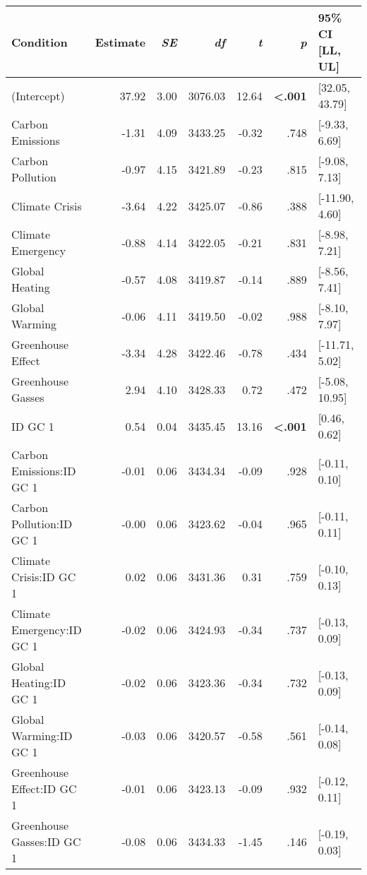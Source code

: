 \begin{table}[ht]
\centering
\begin{tabular}{lrrrrrl}
  \hline
Condition & Estimate & \textit{SE} & \textit{df} & \textit{t} & \textit{p} & 95\% CI [LL, UL] \\ 
  \hline
(Intercept) & 37.92 & 3.00 & 3076.03 & 12.64 & \textbf{\textless  .001} & [32.05, 43.79] \\ 
  Carbon Emissions & -1.31 & 4.09 & 3433.25 & -0.32 & .748 & [-9.33, 6.69] \\ 
  Carbon Pollution & -0.97 & 4.15 & 3421.89 & -0.23 & .815 & [-9.08, 7.13] \\ 
  Climate Crisis & -3.64 & 4.22 & 3425.07 & -0.86 & .388 & [-11.90, 4.60] \\ 
  Climate Emergency & -0.88 & 4.14 & 3422.05 & -0.21 & .831 & [-8.98, 7.21] \\ 
  Global Heating & -0.57 & 4.08 & 3419.87 & -0.14 & .889 & [-8.56, 7.41] \\ 
  Global Warming & -0.06 & 4.11 & 3419.50 & -0.02 & .988 & [-8.10, 7.97] \\ 
  Greenhouse Effect & -3.34 & 4.28 & 3422.46 & -0.78 & .434 & [-11.71, 5.02] \\ 
  Greenhouse Gasses & 2.94 & 4.10 & 3428.33 & 0.72 & .472 & [-5.08, 10.95] \\ 
  ID GC 1 & 0.54 & 0.04 & 3435.45 & 13.16 & \textbf{\textless  .001} & [0.46, 0.62] \\ 
  Carbon Emissions:ID GC 1 & -0.01 & 0.06 & 3434.34 & -0.09 & .928 & [-0.11, 0.10] \\ 
  Carbon Pollution:ID GC 1 & -0.00 & 0.06 & 3423.62 & -0.04 & .965 & [-0.11, 0.11] \\ 
  Climate Crisis:ID GC 1 & 0.02 & 0.06 & 3431.36 & 0.31 & .759 & [-0.10, 0.13] \\ 
  Climate Emergency:ID GC 1 & -0.02 & 0.06 & 3424.93 & -0.34 & .737 & [-0.13, 0.09] \\ 
  Global Heating:ID GC 1 & -0.02 & 0.06 & 3423.36 & -0.34 & .732 & [-0.13, 0.09] \\ 
  Global Warming:ID GC 1 & -0.03 & 0.06 & 3420.57 & -0.58 & .561 & [-0.14, 0.08] \\ 
  Greenhouse Effect:ID GC 1 & -0.01 & 0.06 & 3423.13 & -0.09 & .932 & [-0.12, 0.11] \\ 
  Greenhouse Gasses:ID GC 1 & -0.08 & 0.06 & 3434.33 & -1.45 & .146 & [-0.19, 0.03] \\ 
   \hline
\end{tabular}
\end{table}
